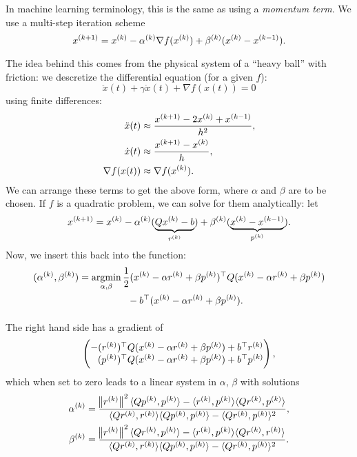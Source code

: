 \documentclass{article}
\begin{document}

In machine learning terminology, this is the same as using a \emph{momentum term}.  We use a
multi-step iteration scheme
\begin{equation*}
  \kth[k+1]{x} = \kth{x} - \kth{\alpha} \nabla f(\kth{x}) + \kth{\beta}(\kth{x} - \kth[k-1]{x}).
\end{equation*}

The idea behind this comes from the physical system of a ``heavy ball'' with friction: we descretize
the differential equation (for a given \(f\)):
\begin{equation*}
  \ddot{x}(t) + \gamma\dot{x}(t) + \nabla f(x(t)) = 0
\end{equation*}
using finite differences:
\begin{align*}
  \ddot{x}(t) &\approx \frac{\kth[k+1]{x} - 2\kth{x} + \kth[k-1]{x}}{h^2}, \\
  \dot{x}(t) &\approx \frac{\kth[k+1]{x} - \kth{x}}{h}, \\
  \nabla f(x(t)) &\approx \nabla f(\kth{x}).
\end{align*}
We can arrange these terms to get the above form, where \(\alpha\) and \(\beta\) are to be chosen.
If \(f\) is a quadratic problem, we can solve for them analytically: let
\begin{equation*}
  \kth[k+1]{x} = \kth{x} - \kth{\alpha} (\underbrace{Q\kth{x} - b}_{\kth{r}})
  + \kth{\beta}(\underbrace{\kth{x} - \kth[k-1]{x}}_{\kth{p}}).
\end{equation*}
Now, we insert this back into the function:
\begin{align*}
  (\kth{\alpha}, \kth{\beta}) &= \argmin_{\alpha, \beta}
  \frac{1}{2} \T{(\kth{x} - \alpha\kth{r} + \beta\kth{p})}Q(\kth{x} - \alpha\kth{r} + \beta\kth{p}) \\
  &\phantom{\argmin_{\alpha, \beta}}\qquad - \T{b}(\kth{x} - \alpha\kth{r} + \beta\kth{p}).
\end{align*}
The right hand side has a gradient of
\begin{equation*}
  \begin{pmatrix}
    -\T{(\kth{r})}Q(\kth{x} - \alpha\kth{r} + \beta\kth{p}) + \T{b}\kth{r} \\
    \phantom{-}\T{(\kth{p})}Q(\kth{x} - \alpha\kth{r} + \beta\kth{p}) + \T{b}\kth{p}
  \end{pmatrix},
\end{equation*}
which when set to zero leads to a linear system in \(\alpha\), \(\beta\) with solutions
\begin{align*}
  \kth{\alpha} &= \frac{\enVert[1]{\kth{r}}^2 \langle Q\kth{p}, \kth{p} \rangle -
                 \langle \kth{r}, \kth{p} \rangle \langle Q\kth{r}, \kth{p} \rangle}{
                 \langle Q\kth{r}, \kth{r} \rangle \langle Q\kth{p}, \kth{p} \rangle
                 - \langle Q\kth{r}, \kth{p} \rangle^2},\\
  \kth{\beta} &= \frac{\enVert[1]{\kth{r}}^2 \langle Q\kth{r}, \kth{p} \rangle -
                 \langle \kth{r}, \kth{p} \rangle \langle Q\kth{r}, \kth{r} \rangle}{
                 \langle Q\kth{r}, \kth{r} \rangle \langle Q\kth{p}, \kth{p} \rangle
                 - \langle Q\kth{r}, \kth{p} \rangle^2}.
\end{align*}
\end{document}
